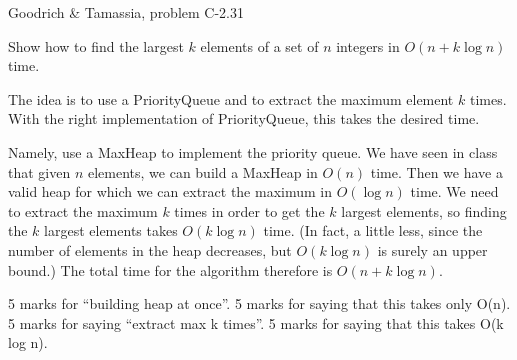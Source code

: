 \begin{authorship}
Goodrich \& Tamassia, problem C-2.31 
\end{authorship}
\begin{usage}
\end{usage}

Show how to find the largest $k$ elements of a set of $n$
integers in $O(n+k\log n)$ time.

\begin{solution}
The idea is to use a PriorityQueue and to extract the maximum element $k$
times.  With the right implementation of PriorityQueue, this takes the
desired time.

Namely, use a MaxHeap to implement the priority queue.  We have seen in
class that given $n$ elements, we can build a MaxHeap in $O(n)$ time.
Then we have a valid heap for which we can extract the maximum in
$O(\log n)$ time.  We need to extract the maximum $k$ times in order to
get the $k$ largest elements, so finding the $k$ largest elements takes
$O(k\log n)$ time.  (In fact, a little less, since the number of elements
in the heap decreases, but $O(k\log n)$ is surely an upper bound.)
The total time for the algorithm therefore is $O(n+k\log n)$.
\end{solution}

\begin{markingScheme}
5 marks for ``building heap at once''.
5 marks for saying that this takes only O(n).
5 marks for saying ``extract max k times''.
5 marks for saying that this takes O(k log n).
\end{markingScheme}
